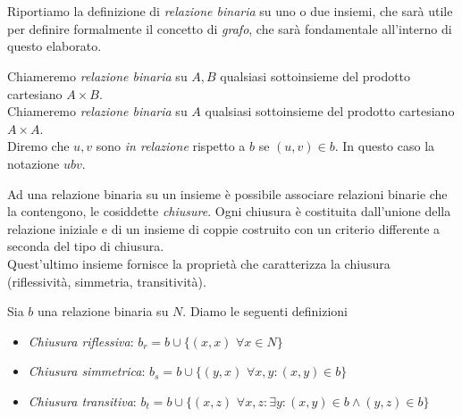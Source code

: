 \section{}


\subsection{}
Riportiamo la definizione di \textit{relazione binaria} su uno o due insiemi, che sarà utile per definire formalmente il concetto di \textit{grafo}, che sarà fondamentale all'interno di questo elaborato.
\begin{definition}
    Chiameremo \textit{relazione binaria} su $A,B$ qualsiasi sottoinsieme del prodotto cartesiano $A \times B$.\\
    Chiameremo \textit{relazione binaria} su $A$ qualsiasi sottoinsieme del prodotto cartesiano $A \times A$.\\
	Diremo che $u,v$ sono \textit{in relazione} rispetto a $b$ se $(u,v) \in b$. In questo caso  la notazione $u b v$.
\end{definition}
Ad una relazione binaria su un insieme è possibile associare relazioni binarie che la contengono, le cosiddette \textit{chiusure}.
Ogni chiusura è costituita dall'unione della relazione iniziale e di un insieme di coppie costruito con un criterio differente a seconda del tipo di chiusura.\\
Quest'ultimo insieme fornisce la proprietà che caratterizza la chiusura (riflessività, simmetria, transitività).
\begin{definition}
	Sia $b$ una relazione binaria su $N$.
    Diamo le seguenti definizioni
    \begin{itemize}
        \item \textit{Chiusura riflessiva}: $b_r = b \cup \{(x,x) \,\, \forall x \in N\}$
        \item \textit{Chiusura simmetrica}: $b_s = b \cup \{(y,x) \,\, \forall x,y : (x,y) \in b\}$
        \item \textit{Chiusura transitiva}: $b_t = b \cup \{(x,z) \,\, \forall x,z : \exists y : (x,y) \in b \land (y,z) \in b\}$
    \end{itemize}
\end{definition}

